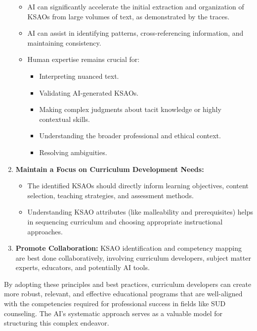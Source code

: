 \documentclass[
  letterpaper,
  DIV=11,
  numbers=noendperiod]{scrartcl}
\providecommand{\tightlist}{%
  \setlength{\itemsep}{0pt}\setlength{\parskip}{0pt}}
\begin{document}
\begin{enumerate}
  \begin{itemize}
  \tightlist
  \item
    AI can significantly accelerate the initial extraction and
    organization of KSAOs from large volumes of text, as demonstrated by
    the traces.
  \item
    AI can assist in identifying patterns, cross-referencing
    information, and maintaining consistency.
  \item
    Human expertise remains crucial for:

    \begin{itemize}
    \tightlist
    \item
      Interpreting nuanced text.
    \item
      Validating AI-generated KSAOs.
    \item
      Making complex judgments about tacit knowledge or highly
      contextual skills.
    \item
      Understanding the broader professional and ethical context.
    \item
      Resolving ambiguities.
    \end{itemize}
  \end{itemize}
\item
  \textbf{Maintain a Focus on Curriculum Development Needs:}

  \begin{itemize}
  \tightlist
  \item
    The identified KSAOs should directly inform learning objectives,
    content selection, teaching strategies, and assessment methods.
  \item
    Understanding KSAO attributes (like malleability and prerequisites)
    helps in sequencing curriculum and choosing appropriate
    instructional approaches.
  \end{itemize}
\item
  \textbf{Promote Collaboration:} KSAO identification and competency
  mapping are best done collaboratively, involving curriculum
  developers, subject matter experts, educators, and potentially AI
  tools.
\end{enumerate}

By adopting these principles and best practices, curriculum developers
can create more robust, relevant, and effective educational programs
that are well-aligned with the competencies required for professional
success in fields like SUD counseling. The AI's systematic approach
serves as a valuable model for structuring this complex endeavor.
\end{document}
